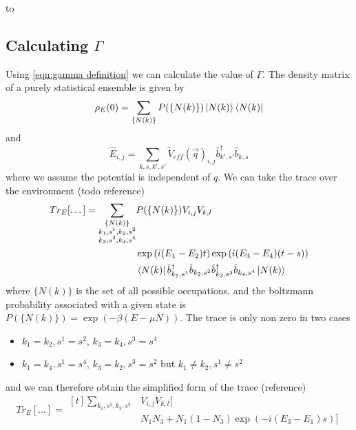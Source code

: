 to

\subsection{Calculating \(\Gamma \)}
Using \cref{eqn:gamma definition}
we can calculate the value of \(\Gamma \).
The
density matrix of a purely
statistical ensemble is given
by~\cite{sakurai_napolitano_2020}
\begin{equation}
    \rho_E(0) = \sum_{\{N(k)\}}
    P(\{N(k)\})
    \ket{N(k)} \bra{N(k)}
\end{equation}
and
\begin{equation}
    \hat{E}_{i,j} = \sum_{k,s,k',s'}
    {\tilde{V}_{eff}(\vec{q})}_{i,j}
    \hat{b}^\dagger_{k',s'}\hat{b}_{k,s}
\end{equation}
where we assume the potential
is independent of \(q\). We can
take the trace over the
environment (todo reference)
\begin{equation}
    Tr_E[\dots]  = \begin{aligned}[t]
        \sum_{\substack{\{N(k)\}                             \\
        k_1,s^1,k_2,s^2                                      \\
                k_3,s^3,k_4,s^4 }}
         & P(\{N(k)\}) V_{i,j} V_{k,l}                       \\
         & \exp{(i(E_1 - E_2) t)} \exp{(i(E_3 - E_4) (t-s))} \\
         & \bra{N(k)}
        \hat{b}_{k_1,s^1}^\dagger{} \hat{b}_{k_2,s^2}
        \hat{b}_{k_3,s^3}^\dagger{} \hat{b}_{k_4,s^4}
        \ket{N(k)}
    \end{aligned}
\end{equation}
where \( \{N(k)\} \) is the set of
all possible occupations, and
the boltzmann
probability associated with a
given state is
\(P(\{N(k)\}) = \exp{(-\beta{}(E-\mu N))}\).
The trace is only non zero in two
cases
\begin{itemize}
    \item \(k_1=k_2, s^1=s^2\),
          \(k_3=k_4, s^3=s^4\)
    \item \(k_1=k_4, s^1=s^4\),
          \(k_3=k_2, s^3=s^2\) but
          \(k_1\neq{}k_2, s^1\neq{}s^2\)
\end{itemize}
and we can therefore obtain the
simplified form of the trace (reference)
\begin{equation}
    Tr_E[\dots] = \begin{aligned}[t]
        \sum_{k_1,s^1,k_3,s^3 }
         & V_{i,j} V_{k,l} [ \\
         & N_1 N_3
                + N_1 (1 - N_3) \exp{(-i(E_3 - E_1)s)}]
    \end{aligned}
\end{equation}
